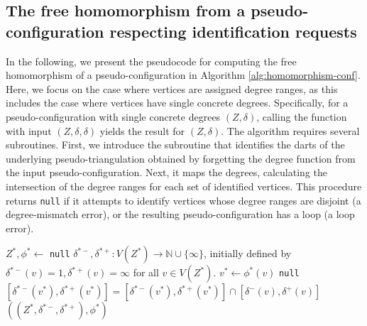 \documentclass[main.tex]{subfiles}
\begin{document}
\subsection{The free homomorphism from a pseudo-configuration respecting identification requests}
\label{code:hom-conf}
In the following, we present the pseudocode for computing the free homomorphism of a pseudo-configuration in Algorithm \ref{alg:homomorphism-conf}.
Here, we focus on the case where vertices are assigned degree ranges, as this includes the case where vertices have single concrete degrees.
Specifically, for a pseudo-configuration with single concrete degrees $(Z, \delta)$, calling the function with input $(Z, \delta, \delta)$ yields the result for $(Z, \delta)$.
The algorithm requires several subroutines.
First, we introduce the subroutine \dartIdentification that identifies the darts of the underlying pseudo-triangulation obtained by forgetting the degree function from the input pseudo-configuration.
Next, it maps the degrees, calculating the intersection of the degree ranges for each set of identified vertices.
This procedure returns \texttt{null} if it attempts to identify vertices whose degree ranges are disjoint (a degree-mismatch error), or the resulting pseudo-configuration has a loop (a loop error).

\begin{algorithm}[H]
    \caption{\dartIdentificationWithLink($(Z, \delta^-, \delta^+)$, $\{(e_i, f_i)\}_{i=1}^k$)}
    \label{alg:dartIdentification}
    \begin{algorithmic}[1]
        \State $Z^*, \phi^* \gets $ 
            \State \Return \texttt{null} 
        \EndIf
        \State $\delta^{*-}, \delta^{*+} \colon V(Z^*) \to \mathbb{N} \cup \{\infty\}$, initially defined by $\delta^{*-}(v)=1, \delta^{*+}(v)=\infty$ for all $v \in V(Z^*)$.
            \State $v^* \gets \phi^*(v)$
             
                \State \Return \texttt{null} 
            \EndIf
            \State $[\delta^{*-}(v^*), \delta^{*+}(v^*)]=[\delta^{*-}(v^*), \delta^{*+}(v^*)] \cap [\delta^{-}(v), \delta^{+}(v)]$ 
        \EndFor
        \State \Return $((Z^*, \delta^{*-}, \delta^{*+}), \phi^*)$
    \end{algorithmic}
\end{algorithm}
\end{document}
